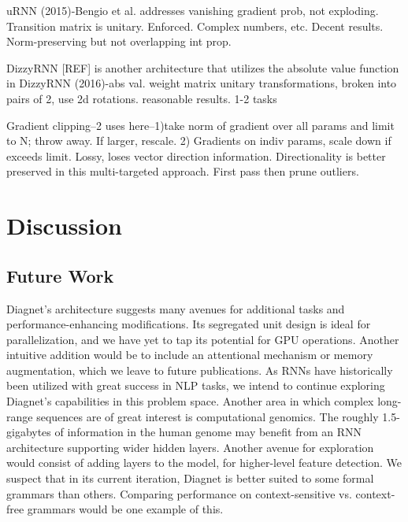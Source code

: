 \documentclass{article}
\begin{document}
uRNN (2015)-Bengio et al.  addresses vanishing gradient prob, not exploding.  Transition matrix is unitary.  Enforced.  Complex numbers, etc. Decent results. Norm-preserving but not overlapping int prop.

DizzyRNN [REF] is another architecture that utilizes the absolute value function in 
DizzyRNN (2016)-abs val. weight matrix unitary transformations, broken into pairs of 2, use 2d rotations. reasonable results. 1-2 tasks 

Gradient clipping--2 uses here--1)take norm of gradient over all params and limit to N; throw away.  If larger, rescale.  2) Gradients on indiv params, scale down if exceeds limit.  Lossy, loses vector direction information. Directionality is better preserved in this multi-targeted approach. First pass then prune outliers.   


\section{Discussion}
\subsection{Future Work}
Diagnet's architecture suggests many avenues for additional tasks and performance-enhancing modifications.  Its segregated unit design is ideal for parallelization, and we have yet to tap its potential for GPU operations.  Another intuitive addition would be to include an attentional mechanism or memory augmentation, which we leave to future publications.  
As RNNs have historically been utilized with great success in NLP tasks, we intend to continue exploring Diagnet's capabilities in this problem space.  Another area in which complex long-range sequences are of great interest is computational genomics. The roughly 1.5-gigabytes of information in the human genome may benefit from an RNN architecture supporting wider hidden layers.  
Another avenue for exploration would consist of adding layers to the model, for higher-level feature detection.  We suspect that in its current iteration, Diagnet is better suited to some formal grammars than others.  Comparing performance on context-sensitive vs. context-free grammars would be one example of this. 
\end{document}
